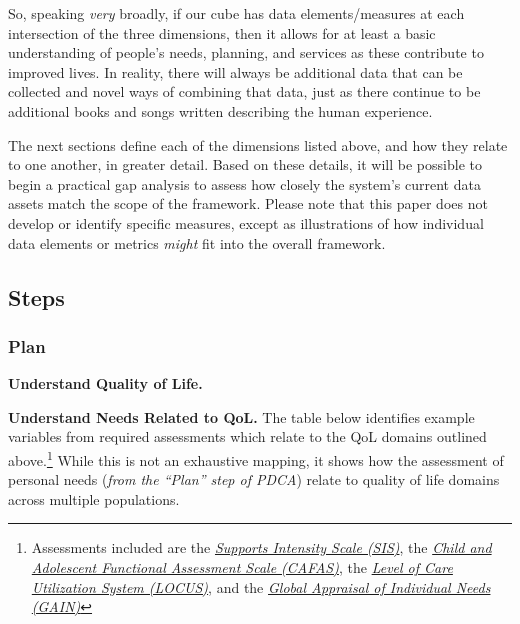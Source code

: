 \documentclass[
]{book}
\begin{document}
So, speaking \emph{very} broadly, if our cube has data elements/measures at each intersection of the three dimensions, then it allows for at least a basic understanding of people's needs, planning, and services as these contribute to improved lives. In reality, there will always be additional data that can be collected and novel ways of combining that data, just as there continue to be additional books and songs written describing the human experience.

The next sections define each of the dimensions listed above, and how they relate to one another, in greater detail. Based on these details, it will be possible to begin a practical gap analysis to assess how closely the system's current data assets match the scope of the framework. Please note that this paper does not develop or identify specific measures, except as illustrations of how individual data elements or metrics \emph{might} fit into the overall framework.

\hypertarget{steps}{%
\subsection{Steps}\label{steps}}

\hypertarget{plan}{%
\subsubsection{Plan}\label{plan}}

\textbf{Understand Quality of Life.}

\textbf{Understand Needs Related to QoL.} The table below identifies example variables from required assessments which relate to the QoL domains outlined above.\footnote{Assessments included are the \href{http://aaidd.org/sis}{\emph{Supports Intensity Scale (SIS)}}, the \href{http://www2.fasoutcomes.com/Content.aspx?ContentID=12}{\emph{Child and Adolescent Functional Assessment Scale (CAFAS)}}, the \href{https://cchealth.org/mentalhealth/pdf/LOCUS.pdf}{\emph{Level of Care Utilization System (LOCUS)}}, and the \href{http://gaincc.org/}{\emph{Global Appraisal of Individual Needs (GAIN)}}} While this is not an exhaustive mapping, it shows how the assessment of personal needs (\emph{from the ``Plan'' step of PDCA}) relate to quality of life domains across multiple populations.
\end{document}
